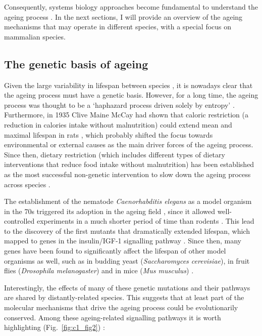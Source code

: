Consequently, systems biology approaches become fundamental to understand the ageing process \cite{Freund2019}. In the next sections, I will provide an overview of the ageing mechanisms that may operate in different species, with a special focus on mammalian species. 

\smallskip

\subsection{The genetic basis of ageing} \label{s:1.1.2}

\smallskip

Given the large variability in lifespan between species \cite{Jones2013}, it is nowadays clear that the ageing process must have a genetic basis. However, for a long time, the ageing process was thought to be a `haphazard process driven solely by entropy' \cite{Kenyon2005}. Furthermore, in 1935 Clive Maine McCay had shown that caloric restriction (a reduction in calories intake without malnutrition) could extend mean and maximal lifespan in rats \cite{McCay1935,McDonald2010}, which probably shifted the focus towards environmental or external causes as the main driver forces of the ageing process. Since then, dietary restriction (which includes different types of dietary interventions that reduce food intake without malnutrition) has been established as the most successful non-genetic intervention to slow down the ageing process across species \cite{Fontana2015}.

\bigskip

The establishment of the nematode \textit{Caenorhabditis elegans} as a model organism in the 70s triggered its adoption in the ageing field \cite{KLASS1976}, since it allowed well-controlled experiments in a much shorter period of time than rodents \cite{Johnson2013}. This lead to the discovery of the first mutants that dramatically extended lifespan, which mapped to genes in the insulin/IGF-1 signalling pathway \cite{Kenyon1993,Morris1996}. Since then, many genes have been found to significantly affect the lifespan of other model organisms as well, such as in budding yeast (\textit{Saccharomyces cerevisiae}), in fruit flies (\textit{Drosophila melanogaster}) and in mice (\textit{Mus musculus}) \cite{Kenyon2005,Kenyon2010,Singh2019}. 

\bigskip

Interestingly, the effects of many of these genetic mutations and their pathways are shared by distantly-related species. This suggests that at least part of the molecular mechanisms that drive the ageing process could be evolutionarily conserved. Among these ageing-related signalling pathways it is worth highlighting (Fig.~\ref{fig:c1_fig2}) \cite{Kenyon2005,Kenyon2010,Singh2019,Greer2008}:


